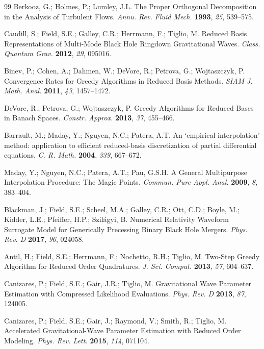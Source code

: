 \documentclass[11pt, a4paper]{article}
\begin{document}
\begin{thebibliography}{99}
Berkooz, G.; Holmes, P.; Lumley, J.L. The Proper Orthogonal Decomposition in the Analysis of Turbulent Flows. \textit{Annu. Rev. Fluid Mech.} \textbf{1993}, \textit{25}, 539--575.

Caudill, S.; Field, S.E.; Galley, C.R.; Herrmann, F.; Tiglio, M. Reduced Basis Representations of Multi-Mode Black Hole Ringdown Gravitational Waves. \textit{Class. Quantum Grav.} \textbf{2012}, \textit{29}, 095016.

Binev, P.; Cohen, A.; Dahmen, W.; DeVore, R.; Petrova, G.; Wojtaszczyk, P. Convergence Rates for Greedy Algorithms in Reduced Basis Methods. \textit{SIAM J. Math. Anal.} \textbf{2011}, \textit{43}, 1457--1472.

DeVore, R.; Petrova, G.; Wojtaszczyk, P. Greedy Algorithms for Reduced Bases in Banach Spaces. \textit{Constr. Approx.} \textbf{2013}, \textit{37}, 455--466.

Barrault, M.; Maday, Y.; Nguyen, N.C.; Patera, A.T. An `empirical interpolation' method: application to efficient reduced-basis discretization of partial differential equations. \textit{C. R. Math.} \textbf{2004}, \textit{339}, 667--672.

Maday, Y.; Nguyen, N.C.; Patera, A.T.; Pau, G.S.H. A General Multipurpose Interpolation Procedure: The Magic Points. \textit{Commun. Pure Appl. Anal.} \textbf{2009}, \textit{8}, 383--404.

Blackman, J.; Field, S.E.; Scheel, M.A.; Galley, C.R.; Ott, C.D.; Boyle, M.; Kidder, L.E.; Pfeiffer, H.P.; Szil\'agyi, B. Numerical Relativity Waveform Surrogate Model for Generically Precessing Binary Black Hole Mergers. \textit{Phys. Rev. D} \textbf{2017}, \textit{96}, 024058.

Antil, H.; Field, S.E.; Herrmann, F.; Nochetto, R.H.; Tiglio, M. Two-Step Greedy Algorithm for Reduced Order Quadratures. \textit{J. Sci. Comput.} \textbf{2013}, \textit{57}, 604--637.

Canizares, P.; Field, S.E.; Gair, J.R.; Tiglio, M. Gravitational Wave Parameter Estimation with Compressed Likelihood Evaluations. \textit{Phys. Rev. D} \textbf{2013}, \textit{87}, 124005.

Canizares, P.; Field, S.E.; Gair, J.; Raymond, V.; Smith, R.; Tiglio, M. Accelerated Gravitational-Wave Parameter Estimation with Reduced Order Modeling. \textit{Phys. Rev. Lett.} \textbf{2015}, \textit{114}, 071104.


\end{thebibliography}
\end{document}
